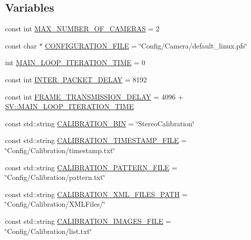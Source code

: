 \subsection*{Variables}
\begin{DoxyCompactItemize}
\item 
const int \hyperlink{namespace_s_v_aa2acf99b8a3b122f688769ef693c30ae}{M\-A\-X\-\_\-\-N\-U\-M\-B\-E\-R\-\_\-\-O\-F\-\_\-\-C\-A\-M\-E\-R\-A\-S} = 2
\item 
const char $\ast$ \hyperlink{namespace_s_v_aa00fc841744191453046361becae6ae6}{C\-O\-N\-F\-I\-G\-U\-R\-A\-T\-I\-O\-N\-\_\-\-F\-I\-L\-E} = \char`\"{}Config/Camera/default\-\_\-linux.\-pfs\char`\"{}
\item 
int \hyperlink{namespace_s_v_a778a8d19ba21816aca4e8ca6c2dcd4a2}{M\-A\-I\-N\-\_\-\-L\-O\-O\-P\-\_\-\-I\-T\-E\-R\-A\-T\-I\-O\-N\-\_\-\-T\-I\-M\-E} = 0
\item 
const int \hyperlink{namespace_s_v_aa245d3d1f71d5a419cefdc42626b1c07}{I\-N\-T\-E\-R\-\_\-\-P\-A\-C\-K\-E\-T\-\_\-\-D\-E\-L\-A\-Y} = 8192
\item 
const int \hyperlink{namespace_s_v_a91d9ea38d5f6a4803e3e94ad8c9a722a}{F\-R\-A\-M\-E\-\_\-\-T\-R\-A\-N\-S\-M\-I\-S\-S\-I\-O\-N\-\_\-\-D\-E\-L\-A\-Y} = 4096 + \hyperlink{namespace_s_v_a778a8d19ba21816aca4e8ca6c2dcd4a2}{S\-V\-::\-M\-A\-I\-N\-\_\-\-L\-O\-O\-P\-\_\-\-I\-T\-E\-R\-A\-T\-I\-O\-N\-\_\-\-T\-I\-M\-E}
\item 
const std\-::string \hyperlink{namespace_s_v_a07b166ccd37fa68ea084cebb48a1f6f7}{C\-A\-L\-I\-B\-R\-A\-T\-I\-O\-N\-\_\-\-B\-I\-N} = \char`\"{}Stereo\-Calibration\char`\"{}
\item 
const std\-::string \hyperlink{namespace_s_v_a25683376004000d485cf2c87db0f6b2a}{C\-A\-L\-I\-B\-R\-A\-T\-I\-O\-N\-\_\-\-T\-I\-M\-E\-S\-T\-A\-M\-P\-\_\-\-F\-I\-L\-E} = \char`\"{}Config/Calibration/timestamp.\-txt\char`\"{}
\item 
const std\-::string \hyperlink{namespace_s_v_ab14088c3b114b4905a5064056e160576}{C\-A\-L\-I\-B\-R\-A\-T\-I\-O\-N\-\_\-\-P\-A\-T\-T\-E\-R\-N\-\_\-\-F\-I\-L\-E} = \char`\"{}Config/Calibration/pattern.\-txt\char`\"{}
\item 
const std\-::string \hyperlink{namespace_s_v_a08efa5f4f7f6a650b132fe6ce146c7a6}{C\-A\-L\-I\-B\-R\-A\-T\-I\-O\-N\-\_\-\-X\-M\-L\-\_\-\-F\-I\-L\-E\-S\-\_\-\-P\-A\-T\-H} = \char`\"{}Config/Calibration/X\-M\-L\-Files/\char`\"{}
\item 
const std\-::string \hyperlink{namespace_s_v_a31f33ecf5d55099dbdcbf01cbdc8f85e}{C\-A\-L\-I\-B\-R\-A\-T\-I\-O\-N\-\_\-\-I\-M\-A\-G\-E\-S\-\_\-\-F\-I\-L\-E} = \char`\"{}Config/Calibration/list.\-txt\char`\"{}

\end{DoxyCompactItemize}
